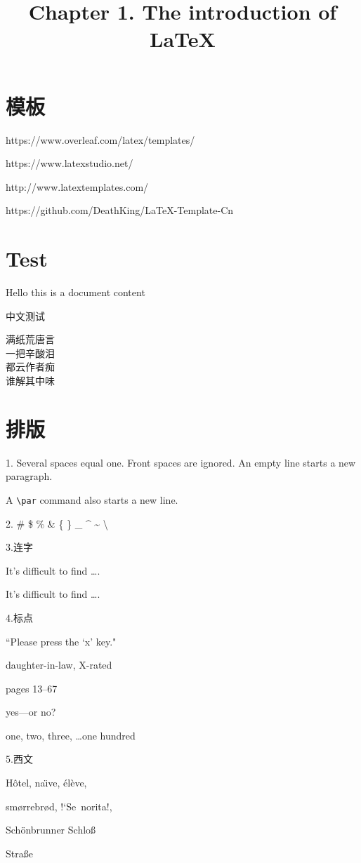 \documentclass[12pt,UTF8]{ctexart}%
\title{Chapter 1. The introduction of \LaTeX}
\begin{document}
\section{模板}

https://www.overleaf.com/latex/templates/

https://www.latexstudio.net/

http://www.latextemplates.com/

https://github.com/DeathKing/LaTeX-Template-Cn


\section{Test}
Hello this is a document content

中文测试

\begin{center}
满纸荒唐言\\
一把辛酸泪\\
都云作者痴\\
谁解其中味\\
\end{center}

\newpage
\section{排版}
1.
Several spaces equal one.
Front spaces are ignored.
An empty line starts a new
paragraph.\par
A \verb|\par| command also
starts a new line.

2.
\# \$ \% \& \{ \} \_
\^{} \~{} \textbackslash

3.连字\par
It's difficult to find \ldots .\par
It's dif{}f{}icult to f{}ind \ldots .

4.标点\par
``Please press the `x' key."\par
daughter-in-law, X-rated\par
pages 13--67\par
yes---or no?\par
one, two, three, \dots one hundred\par

5.西文\par
H\^otel, na\"\i ve, \'el\`eve,\par
sm\o rrebr\o d, !`Se\ norita!,\par
Sch\"onbrunner Schlo\ss{}\par
Stra\ss e
\end{document}
